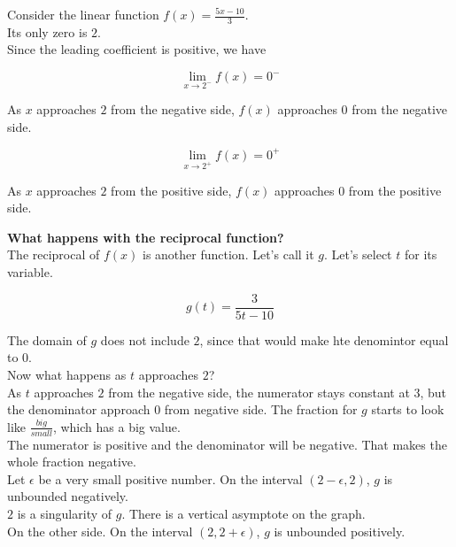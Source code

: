 \documentclass{ximera}
\begin{document}
\begin{exmaple}

Consider the linear function $f(x) = \frac{5x - 10}{3}$. \\

Its only zero is $2$. \\

Since the leading coefficient is positive, we have


\[
\lim\limits_{x \to 2^-}f(x) = 0^-
\]


As $x$ approaches $2$ from the negative side, $f(x)$ approaches $0$ from the negative side.





\[
\lim\limits_{x \to 2^+}f(x) = 0^+
\]


As $x$ approaches $2$ from the positive side, $f(x)$ approaches $0$ from the positive side.


\textbf{\textcolor{blue!55!black}{What happens with the reciprocal function?}} \\

The reciprocal of $f(x)$ is another function.  Let's call it $g$.  Let's select $t$ for its variable.


\[
g(t) = \frac{3}{5t - 10}
\]


The domain of $g$ does not include $2$, since that would make hte denomintor equal to $0$. \\


Now what happens as $t$ approaches $2$? \\

As $t$ approaches $2$ from the negative side, the numerator stays constant at $3$, but the denominator approach $0$ from negative side.  The fraction for $g$ starts to look like $\frac{big}{small}$, which has a big value. \\

The numerator is positive and the denominator will be negative.  That makes the whole fraction negative.  \\


Let $\epsilon$ be a very small positive number. On the interval $(2 - \epsilon, 2)$, $g$ is unbounded negatively. \\

$2$ is a singularity of $g$.  There is a vertical asymptote on the graph. \\




On the other side. On the interval $(2, 2 + \epsilon)$, $g$ is unbounded positively. \\











\end{exmaple}
\end{document}
